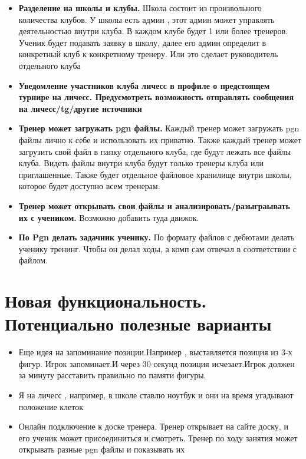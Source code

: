 \documentclass[a4paper,12pt]{article}
\begin{document}
\begin{itemize}
    \item \textbf{Разделение на школы и клубы.} Школа состоит из произвольного количества клубов. У школы есть админ
    , этот админ может управлять деятельностью внутри клуба. В каждом клубе будет 1 или более тренеров.
    Ученик будет подавать заявку в школу, далее его админ определит в конкретный клуб к конкретному тренеру. Или это сделает руководитель отдельного клуба
    \item \textbf{Уведомление участников клуба личесс в профиле о предстоящем турнире на личесс. Предусмотреть возможность отправлять сообщения на личесс/tg/другие источники}
    \item \textbf{Тренер может загружать pgn файлы.} Каждый тренер может загружать pgn файлы лично к себе и использовать их приватно. Также каждый тренер может загрузить свой файл в папку отдельного клуба, где будут лежать все файлы клуба.
    Видеть файлы внутри клуба будут только тренеры клуба или приглашенные. Также будет отдельное файловое хранилище внутри школы, которое будет доступно всем тренерам.
    \item \textbf{Тренер может открывать свои файлы и анализировать/разыграывать их с учеником.} Возможно добавить туда движок.
    \item \textbf{По Pgn делать задачник ученику.} По формату файлов с дебютами делать ученику тренинг. Чтобы он делал ходы, а комп сам отвечал в соответствии с файлом.

\end{itemize}

\section{Новая функциональность. Потенциально полезные варианты}

\begin{itemize}

    \item Еще идея на запоминание позиции.Например , выставляется позиция из 3-х фигур. Игрок запоминает.И через 30 секунд позиция исчезает.Игрок должен за минуту расставить правильно по памяти фигуры.
    \item Я на личесс , например, в школе ставлю ноутбук и они на время угадывают положение клеток
    \item Онлайн подключение к доске тренера. Тренер открывает на сайте доску, и его ученик может присоединиться и смотреть.
    Тренер по ходу занятия может открывать  разные pgn файлы и показывать их

\end{itemize}
\end{document}
